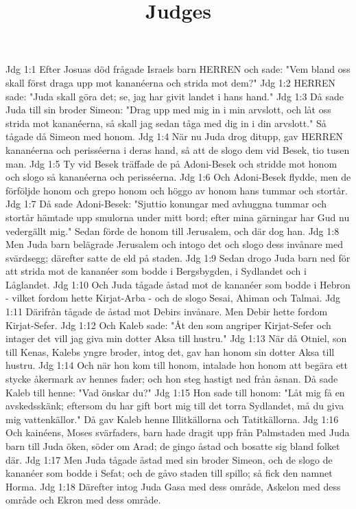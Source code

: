 

\title{Judges}

Jdg 1:1  Efter Josuas död frågade Israels barn HERREN och sade: "Vem bland oss skall först draga upp mot kananéerna och strida mot dem?"
Jdg 1:2  HERREN sade: "Juda skall göra det; se, jag har givit landet i hans hand."
Jdg 1:3  Då sade Juda till sin broder Simeon: "Drag upp med mig in i min arvslott, och låt oss strida mot kananéerna, så skall jag sedan tåga med dig in i din arvslott." Så tågade då Simeon med honom.
Jdg 1:4  När nu Juda drog ditupp, gav HERREN kananéerna och perisséerna i deras hand, så att de slogo dem vid Besek, tio tusen man.
Jdg 1:5  Ty vid Besek träffade de på Adoni-Besek och stridde mot honom och slogo så kananéerna och perisséerna.
Jdg 1:6  Och Adoni-Besek flydde, men de förföljde honom och grepo honom och höggo av honom hans tummar och stortår.
Jdg 1:7  Då sade Adoni-Besek: "Sjuttio konungar med avhuggna tummar och stortår hämtade upp smulorna under mitt bord; efter mina gärningar har Gud nu vedergällt mig." Sedan förde de honom till Jerusalem, och där dog han.
Jdg 1:8  Men Juda barn belägrade Jerusalem och intogo det och slogo dess invånare med svärdsegg; därefter satte de eld på staden.
Jdg 1:9  Sedan drogo Juda barn ned för att strida mot de kananéer som bodde i Bergsbygden, i Sydlandet och i Låglandet.
Jdg 1:10  Och Juda tågade åstad mot de kananéer som bodde i Hebron - vilket fordom hette Kirjat-Arba - och de slogo Sesai, Ahiman och Talmai.
Jdg 1:11  Därifrån tågade de åstad mot Debirs invånare. Men Debir hette fordom Kirjat-Sefer.
Jdg 1:12  Och Kaleb sade: "Åt den som angriper Kirjat-Sefer och intager det vill jag giva min dotter Aksa till hustru."
Jdg 1:13  När då Otniel, son till Kenas, Kalebs yngre broder, intog det, gav han honom sin dotter Aksa till hustru.
Jdg 1:14  Och när hon kom till honom, intalade hon honom att begära ett stycke åkermark av hennes fader; och hon steg hastigt ned från åsnan. Då sade Kaleb till henne: "Vad önskar du?"
Jdg 1:15  Hon sade till honom: "Låt mig få en avskedsskänk; eftersom du har gift bort mig till det torra Sydlandet, må du giva mig vattenkällor." Då gav Kaleb henne Illitkällorna och Tatitkällorna.
Jdg 1:16  Och kainéens, Moses svärfaders, barn hade dragit upp från Palmstaden med Juda barn till Juda öken, söder om Arad; de gingo åstad och bosatte sig bland folket där.
Jdg 1:17  Men Juda tågade åstad med sin broder Simeon, och de slogo de kananéer som bodde i Sefat; och de gåvo staden till spillo; så fick den namnet Horma.
Jdg 1:18  Därefter intog Juda Gasa med dess område, Askelon med dess område och Ekron med dess område.
